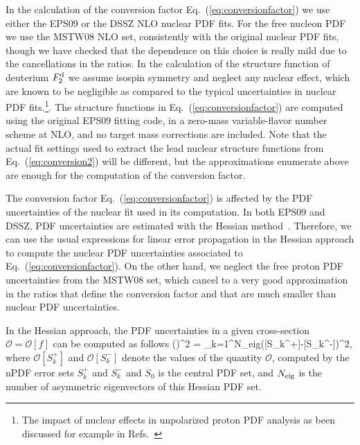 In the calculation of the conversion factor
Eq.~(\ref{eq:conversionfactor}) we use either the EPS09 or the
DSSZ NLO nuclear PDF fits.
%
For the free nucleon PDF we use the MSTW08 NLO set, consistently
with the original nuclear PDF fits, though we have checked
that the dependence on this choice is really mild due to
the cancellations in the ratios.
%
In the calculation of the structure function of deuterium
$F_2^{\rm d}$ we assume isospin symmetry and neglect
any nuclear effect, which are known to be negligible
as compared to the typical
uncertainties in nuclear PDF fits.\footnote{The impact
  of nuclear effects in unpolarized proton PDF analysis
  as been discussed for example in
  Refs.~\cite{Ball:2013gsa,Owens:2012bv,Harland-Lang:2014zoa}}.
%
The structure functions in Eq.~(\ref{eq:conversionfactor})
are computed using the original EPS09 fitting code, in a zero-mass
variable-flavor number scheme at NLO, and no target mass
corrections are included.
%
Note that the actual fit settings used to extract the
lead nuclear structure functions from Eq.~(\ref{eq:conversion2})
will be different, but the approximations enumerate
above are enough for the computation of the conversion factor.

The conversion factor Eq.~(\ref{eq:conversionfactor}) is affected
by the PDF uncertainties of the nuclear fit used in its computation.
%
In both EPS09 and DSSZ, PDF uncertainties are estimated with
the Hessian method~\cite{Pumplin:2001ct}.
%
Therefore, we can use the usual expressions for linear
error propagation in the Hessian approach to compute
the nuclear PDF uncertainties associated to
Eq.~(\ref{eq:conversionfactor}).
%
On the other hand, we neglect the free proton PDF uncertainties
from the MSTW08 set, which cancel to a very good approximation
in the ratios that define the conversion factor and that
are much smaller than nuclear PDF uncertainties.

In the Hessian approach, the PDF
uncertainties in a given cross-section
$\mathcal{O}=\mathcal{O}[f]$ can be computed as follows
\be
\left(\Delta {}\right)^2 = \sum_{k=1}^{N_{\rm eig}}\left([S_k^+]-[S_k^-]\right)^2,
\label{compression4}
\ee
where $\mathcal{O}[S_k^+]$ and $\mathcal{O}[S_k^-]$ denote the values of the quantity $\mathcal{O}$, computed by the nPDF error sets $S_k^+$ and $S_k^-$ and $S_0$ is the central PDF set, and $N_{\rm eig}$ is the number
of asymmetric eigenvectors of this Hessian PDF set.

